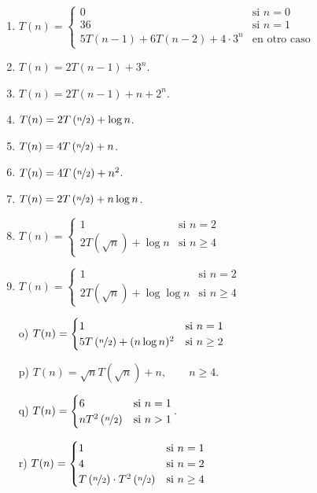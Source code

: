 \begin{ejercicio}
\begin{enumerate}[label=\alph*)]
        \item $T(n) = \begin{cases}
            0 & \text{si } n = 0 \\
            36 & \text{si } n = 1 \\
            5T(n-1) + 6T(n-2) + 4\cdot 3^n & \text{en otro caso}
        \end{cases}$

        \item $T(n)=2T(n-1) + 3^n$.
        \item $T(n)=2T(n-1) + n+2^n$.
        \item $T(n)=2T\left(\nicefrac{n}{2}\right) + \log n$.
        \item $T(n)=4T\left(\nicefrac{n}{2}\right) + n$.
        \item $T(n)=4T\left(\nicefrac{n}{2}\right) + n^2$.
        \item $T(n)=2T\left(\nicefrac{n}{2}\right) + n\log n$.
        \item $T(n) = \begin{cases}
            1 & \text{si } n = 2 \\
            2T\left(\sqrt{n}\right) + \log n & \text{si } n \geq 4
        \end{cases}$

        \item $T(n) = \begin{cases}
            1 & \text{si } n = 2 \\
            2T\left(\sqrt{n}\right) + \log \log n & \text{si } n \geq 4
        \end{cases}$

        \item[o)] $T(n) = \begin{cases}
            1 & \text{si } n = 1 \\
            5T\left(\nicefrac{n}{2}\right) + (n\log n)^2 & \text{si } n \geq 2
        \end{cases}$

        \item[p)] $T(n)=\sqrt{n} T\left(\sqrt{n}\right) + n,\qquad n\geq 4$.
        \item[q)] $T(n)=\begin{cases}
            6 & \text{si } n=1 \\
            nT^2\left(\nicefrac{n}{2}\right) & \text{si } n>1
        \end{cases}$.

        \item[r)] $T(n) = \begin{cases}
            1 & \text{si } n = 1 \\
            4 & \text{si } n = 2 \\
            T\left(\nicefrac{n}{2}\right) \cdot T^2\left(\nicefrac{n}{2}\right) & \text{si } n \geq 4
        \end{cases}$
    \end{enumerate}
\end{ejercicio}


